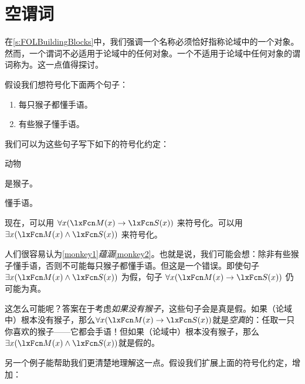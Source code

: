 
\section{空谓词}

在\cref{s:FOLBuildingBlocks}中，我们强调一个名称必须恰好指称论域中的一个对象。然而，一个谓词不必适用于论域中的任何对象。一个不适用于论域中任何对象的谓词称为。这一点值得探讨。


假设我们想符号化下面两个句子：


\begin{enumerate}
		\item\label{monkey1} 每只猴子都懂手语。
		\item\label{monkey2} 有些猴子懂手语。
	\end{enumerate}


我们可以为这些句子写下如下的符号化约定：


\begin{ekey}
		\item[\text{论域}] 动物
		\item[\atom{M}{x}]  是猴子。
		\item[\atom{S}{x}]  懂手语。
	\end{ekey}


现在，可以用 $\forall x(\atom{M}{x} \eif
\atom{S}{x})$ 来符号化。可以用 $\exists
x(\atom{M}{x} \eand \atom{S}{x})$ 来符号化。

人们很容易认为\cref*{monkey1}\emph{蕴涵}\cref*{monkey2}。也就是说，我们可能会想：除非有些猴子懂手语，否则不可能每只猴子都懂手语。但这是一个错误。即使句子 $\exists x(\atom{M}{x} \eand \atom{S}{x})$ 为假，句子 $\forall x(\atom{M}{x} \eif \atom{S}{x})$ 仍可能为真。

这怎么可能呢？答案在于考虑\emph{如果没有猴子}，这些句子会是真是假。如果（论域中）根本没有猴子，那么$\forall x(\atom{M}{x} \eif \atom{S}{x})$就是\emph{空真}的：任取一只你喜欢的猴子——它都会手语！但如果（论域中）根本没有猴子，那么$\exists x(\atom{M}{x} \eand \atom{S}{x})$就是假的。

另一个例子能帮助我们更清楚地理解这一点。假设我们扩展上面的符号化约定，增加：


